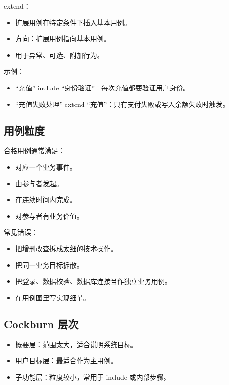 \documentclass[UTF8,zihao=-4]{ctexart}
\begin{document}
extend：

\begin{itemize}
\item 扩展用例在特定条件下插入基本用例。
\item 方向：扩展用例指向基本用例。
\item 用于异常、可选、附加行为。
\end{itemize}

示例：

\begin{itemize}
\item “充值” include “身份验证”：每次充值都要验证用户身份。
\item “充值失败处理” extend “充值”：只有支付失败或写入余额失败时触发。
\end{itemize}

\subsection{用例粒度}

合格用例通常满足：

\begin{itemize}
\item 对应一个业务事件。
\item 由参与者发起。
\item 在连续时间内完成。
\item 对参与者有业务价值。
\end{itemize}

常见错误：

\begin{itemize}
\item 把增删改查拆成太细的技术操作。
\item 把同一业务目标拆散。
\item 把登录、数据校验、数据库连接当作独立业务用例。
\item 在用例图里写实现细节。
\end{itemize}

\subsection{Cockburn 层次}

\begin{itemize}
\item 概要层：范围太大，适合说明系统目标。
\item 用户目标层：最适合作为主用例。
\item 子功能层：粒度较小，常用于 include 或内部步骤。
\end{itemize}
\end{document}
